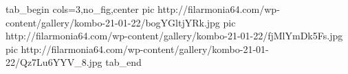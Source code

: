  
 
 
 
 


\ifcmt
  tab_begin cols=3,no_fig,center
     pic http://filarmonia64.com/wp-content/gallery/kombo-21-01-22/bogYGltjYRk.jpg
		 pic http://filarmonia64.com/wp-content/gallery/kombo-21-01-22/fjMlYmDk5Fs.jpg
		 pic http://filarmonia64.com/wp-content/gallery/kombo-21-01-22/Qz7Lu6YYV_8.jpg
  tab_end
\fi
